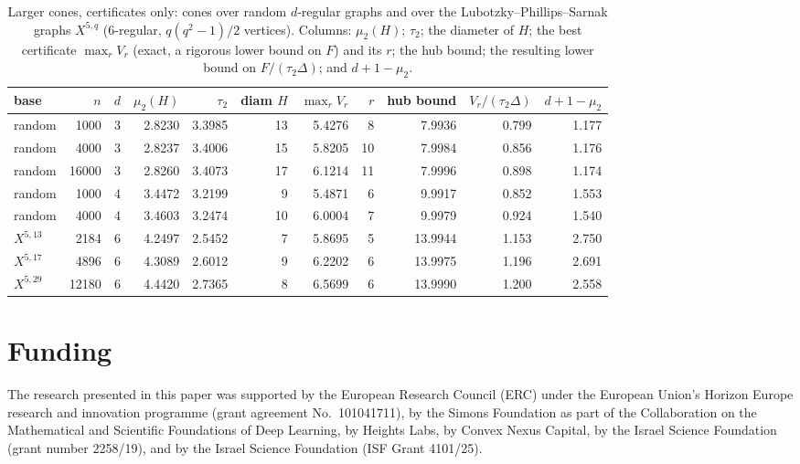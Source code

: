 \documentclass[11pt]{amsart}
\theoremstyle{definition}
\begin{document}
\begin{table}[ht]
\centering
\small
\setlength{\tabcolsep}{4.5pt}
\caption{Larger cones, certificates only: cones over random $d$-regular graphs and over the Lubotzky--Phillips--Sarnak graphs $X^{5,q}$ ($6$-regular, $q(q^2-1)/2$ vertices). Columns: $\mu_2(H)$; $\tau_2$; the diameter of $H$; the best certificate $\max_rV_r$ (exact, a rigorous lower bound on $F$) and its $r$; the hub bound; the resulting lower bound on $F/(\tau_2\Delta)$; and $d+1-\mu_2$.}\label{tab:big}
\begin{tabular}{lrrrrrrrrrr}
\toprule
base & $n$ & $d$ & $\mu_2(H)$ & $\tau_2$ & diam $H$ & $\max_rV_r$ & $r$ & hub bound & $V_r/(\tau_2\Delta)$ & $d+1-\mu_2$\\
\midrule
random & 1000 & 3 & 2.8230 & 3.3985 & 13 & 5.4276 & 8 & 7.9936 & 0.799 & 1.177\\
random & 4000 & 3 & 2.8237 & 3.4006 & 15 & 5.8205 & 10 & 7.9984 & 0.856 & 1.176\\
random & 16000 & 3 & 2.8260 & 3.4073 & 17 & 6.1214 & 11 & 7.9996 & 0.898 & 1.174\\
random & 1000 & 4 & 3.4472 & 3.2199 & 9 & 5.4871 & 6 & 9.9917 & 0.852 & 1.553\\
random & 4000 & 4 & 3.4603 & 3.2474 & 10 & 6.0004 & 7 & 9.9979 & 0.924 & 1.540\\
$X^{5,13}$ & 2184 & 6 & 4.2497 & 2.5452 & 7 & 5.8695 & 5 & 13.9944 & 1.153 & 2.750\\
$X^{5,17}$ & 4896 & 6 & 4.3089 & 2.6012 & 9 & 6.2202 & 6 & 13.9975 & 1.196 & 2.691\\
$X^{5,29}$ & 12180 & 6 & 4.4420 & 2.7365 & 8 & 6.5699 & 6 & 13.9990 & 1.200 & 2.558\\
\bottomrule
\end{tabular}
\end{table}

\section*{Funding}
The research presented in this paper was supported by the European Research Council (ERC) under the European Union's Horizon Europe research and innovation programme (grant agreement No.~101041711), by the Simons Foundation as part of the Collaboration on the Mathematical and Scientific Foundations of Deep Learning, by Heights Labs, by Convex Nexus Capital, by the Israel Science Foundation (grant number 2258/19), and by the Israel Science Foundation (ISF Grant 4101/25).
\end{document}
